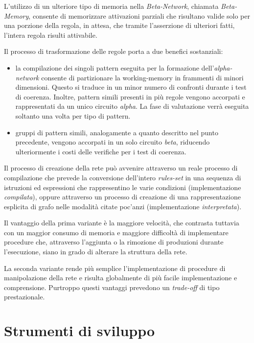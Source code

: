 L'utilizzo di un ulteriore tipo di memoria nella \emph{Beta-Network}, chiamata \emph{Beta-Memory}, consente di memorizzare attivazioni parziali che risultano valide solo per una porzione della regola, in attesa, che tramite l'asserzione di ulteriori fatti, l'intera regola risulti attivabile.

Il processo di trasformazione delle regole porta a due benefici sostanziali:
\begin{itemize}
	\item la compilazione dei singoli pattern eseguita per la formazione dell'\emph{alpha-network} consente di partizionare la working-memory in frammenti di minori dimensioni. Questo si traduce in un minor numero di confronti durante i test di coerenza. Inoltre, pattern simili presenti in più regole vengono accorpati e rappresentati da un unico circuito \emph{alpha}. La fase di valutazione verrà eseguita soltanto una volta per tipo di pattern.
	\item gruppi di pattern simili, analogamente a quanto descritto nel punto precedente, vengono accorpati in un solo circuito \emph{beta}, riducendo ulteriormente i costi delle verifiche per i test di coerenza.
\end{itemize}

Il processo di creazione della rete può avvenire attraverso un reale processo di compilazione \cite{forgy1982} che prevede la conversione dell'intero \emph{rules-set} in una sequenza di istruzioni ed espressioni che rappresentino le varie condizioni (implementazione \emph{compilata}), oppure attraverso un processo di creazione di una rappresentazione esplicita di grafo nelle modalità citate poc'anzi (implementazione \emph{interpretata}). 

Il vantaggio della prima variante è la maggiore velocità, che contrasta tuttavia con un maggior consumo di memoria e maggiore difficoltà di implementare procedure che, attraverso l'aggiunta o la rimozione di produzioni durante l'esecuzione, siano in grado di alterare la struttura della rete.~\cite{Doorenbos95productionmatching}

La seconda variante rende più semplice l'implementazione di procedure di manipolazione della rete e risulta globalmente di più facile implementazione e comprensione. Purtroppo questi vantaggi prevedono un \emph{trade-off} di tipo prestazionale.~\cite{Doorenbos95productionmatching}

\section{Strumenti di sviluppo}

